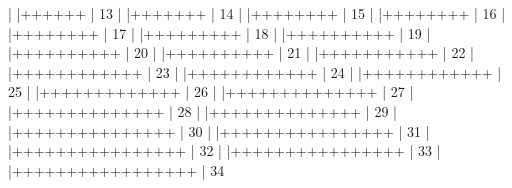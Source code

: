 \documentclass[12pt]{article}
\begin{document}
\begin{Schunk}
\begin{Soutput}
  |                                                        
  |++++++                                            |  13%
  |                                                        
  |+++++++                                           |  14%
  |                                                        
  |++++++++                                          |  15%
  |                                                        
  |++++++++                                          |  16%
  |                                                        
  |++++++++                                          |  17%
  |                                                        
  |+++++++++                                         |  18%
  |                                                        
  |++++++++++                                        |  19%
  |                                                        
  |++++++++++                                        |  20%
  |                                                        
  |++++++++++                                        |  21%
  |                                                        
  |+++++++++++                                       |  22%
  |                                                        
  |++++++++++++                                      |  23%
  |                                                        
  |++++++++++++                                      |  24%
  |                                                        
  |++++++++++++                                      |  25%
  |                                                        
  |+++++++++++++                                     |  26%
  |                                                        
  |++++++++++++++                                    |  27%
  |                                                        
  |++++++++++++++                                    |  28%
  |                                                        
  |++++++++++++++                                    |  29%
  |                                                        
  |+++++++++++++++                                   |  30%
  |                                                        
  |++++++++++++++++                                  |  31%
  |                                                        
  |++++++++++++++++                                  |  32%
  |                                                        
  |++++++++++++++++                                  |  33%
  |                                                        
  |+++++++++++++++++                                 |  34%

\end{Soutput}
\end{Schunk}
\end{document}
